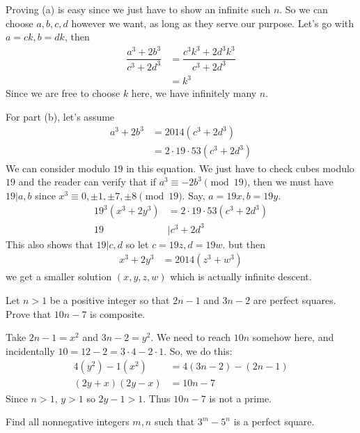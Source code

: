 \documentclass[problems.tex]{subfile}
\begin{document}
	\begin{solution}
		Proving (a) is easy since we just have to show an infinite such $n$. So we can choose $a,b,c,d$ however we want, as long as they serve our purpose. Let's go with $a=ck,b=dk$, then
			\begin{align*}
				\dfrac{a^3+2b^3}{c^3+2d^3}  & = \dfrac{c^3k^3+2d^3k^3}{c^3+2d^3}\\
											& = k^3
			\end{align*}
		Since we are free to choose $k$ here, we have infinitely many $n$.
		
		For part (b), let's assume
			\begin{align*}
				a^3+2b^3 & = 2014(c^3+2d^3)\\
						 & = 2\cdot19\cdot53(c^3+2d^3)
			\end{align*}
		We can consider modulo $19$ in this equation. We just have to check cubes modulo $19$ and the reader can verify that if $a^3\equiv-2b^3\pmod{19}$, then we must have $19|a,b$ since $x^3\equiv0,\pm1,\pm7,\pm8\pmod{19}$. Say, $a=19x,b=19y$.
			\begin{align*}
				19^3(x^3+2y^3) & = 2\cdot19\cdot53(c^3+2d^3)\\
				19 & |c^3+2d^3
			\end{align*}
		This also shows that $19|c,d$ so let $c=19z,d=19w$. but then 
			\begin{align*}
				x^3+2y^3 & = 2014(z^3+w^3)
			\end{align*}
		we get a smaller solution $(x,y,z,w)$ which is actually infinite descent.
	\end{solution}
	
	\begin{problem}[Croatia $2015$]
		Let $n>1$ be a positive integer so that $2n-1$ and $3n-2$ are perfect squares. Prove that $10n-7$ is composite.
	\end{problem}
	
	\begin{solution}
		Take $2n-1=x^2$ and $3n-2=y^2$. We need to reach $10n$ somehow here, and incidentally $10=12-2=3\cdot4-2\cdot1$. So, we do this:
			\begin{align*}
				4(y^2)-1(x^2) & = 4(3n-2)-(2n-1)\\
				(2y+x)(2y-x)  & = 10n-7
			\end{align*}
		Since $n>1$, $y>1$ so $2y-1>1$. Thus $10n-7$ is not a prime.
	\end{solution}
	
	\begin{problem}
		Find all nonnegative integers $m, n$ such that $3^m-5^n$ is a perfect square.
	\end{problem}
	
\end{document}
